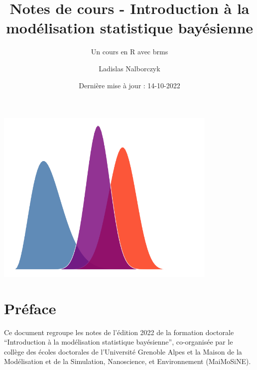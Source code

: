 \documentclass[
  a4paper,11pt,twoside,onecolumn,openright,final,oldfontcommands]{memoir}
\title{Notes de cours - Introduction à la modélisation statistique bayésienne}
\subtitle{Un cours en R avec brms}
\author{Ladislas Nalborczyk}
\date{Dernière mise à jour : 14-10-2022}
\newcommand\blankpage{%
    \null
    \thispagestyle{empty}%
    \newpage
    }
\theoremstyle{definition}
\theoremstyle{definition}
\theoremstyle{definition}
\theoremstyle{definition}
\theoremstyle{remark}
\begin{document}
\maketitle


\thispagestyle{empty}


\begin{center} %

  \includegraphics[width=0.8\textwidth]{figures/cover_distributions.png}

\end{center}

\newpage
\blankpage %

\OnehalfSpacing %


{
\hypersetup{linkcolor=}
\setcounter{tocdepth}{2}
\tableofcontents
}
\hypertarget{pruxe9face}{%
\chapter*{Préface}\label{pruxe9face}}


Ce document regroupe les notes de l'édition 2022 de la formation doctorale ``Introduction à la modélisation statistique bayésienne'', co-organisée par le collège des écoles doctorales de l'Université Grenoble Alpes et la Maison de la Modélisation et de la Simulation, Nanoscience, et Environnement (MaiMoSiNE).
\end{document}
